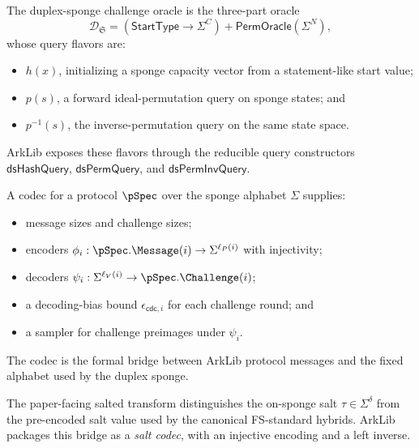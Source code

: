 \begin{definition}
    \label{def:duplex_sponge_challenge_oracle}
    The duplex-sponge challenge oracle is the three-part oracle
    \[
        \mathcal{D}_{\mathfrak{S}}
        =
        (\mathsf{StartType} \to \Sigma^C)
        + \mathsf{PermOracle}(\Sigma^N),
    \]
    whose query flavors are:
    \begin{itemize}
        \item $h(x)$, initializing a sponge capacity vector from a statement-like start value;
        \item $p(s)$, a forward ideal-permutation query on sponge states; and
        \item $p^{-1}(s)$, the inverse-permutation query on the same state space.
    \end{itemize}
    ArkLib exposes these flavors through the reducible query constructors
    $\mathsf{dsHashQuery}$, $\mathsf{dsPermQuery}$, and $\mathsf{dsPermInvQuery}$.
\end{definition}

\begin{definition}
    \label{def:duplex_sponge_codec}
    A codec for a protocol $\pSpec$ over the sponge alphabet $\Sigma$ supplies:
    \begin{itemize}
        \item message sizes and challenge sizes;
        \item encoders $\phi_i : \pSpec.\Message(i) \to \Sigma^{\ell_P(i)}$ with injectivity;
        \item decoders $\psi_i : \Sigma^{\ell_V(i)} \to \pSpec.\Challenge(i)$;
        \item a decoding-bias bound $\epsilon_{\mathsf{cdc},i}$ for each challenge round; and
        \item a sampler for challenge preimages under $\psi_i$.
    \end{itemize}
    The codec is the formal bridge between ArkLib protocol messages and the fixed alphabet used
    by the duplex sponge.
\end{definition}

\begin{definition}
    \label{def:duplex_sponge_salt_codec}
    The paper-facing salted transform distinguishes the on-sponge salt
    $\tau \in \Sigma^\delta$ from the pre-encoded salt value used by the canonical FS-standard
    hybrids. ArkLib packages this bridge as a \emph{salt codec}, with an injective encoding and a
    left inverse.
\end{definition}

